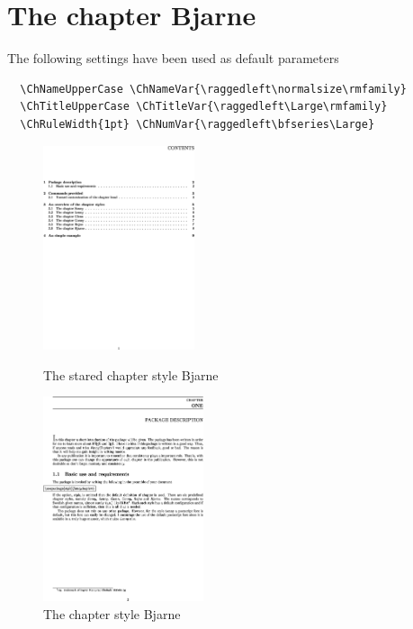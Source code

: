 \documentclass{report}
\begin{document}
    \section{The chapter Bjarne}
    The following settings have been used as default parameters
    {\small\begin{verbatim}
  \ChNameUpperCase \ChNameVar{\raggedleft\normalsize\rmfamily}
  \ChTitleUpperCase \ChTitleVar{\raggedleft\Large\rmfamily}
  \ChRuleWidth{1pt} \ChNumVar{\raggedleft\bfseries\Large}
     \end{verbatim}}
    \begin{figure}[h]
      \begin{minipage}{7 cm}
        \centerline{\includegraphics[height=6cm]{Bjarnes.eps}} 
        \caption{The stared chapter style Bjarne}
      \end{minipage}\hfill
      \begin{minipage}{7 cm}
        \centerline{\includegraphics[height=6cm]{Bjarne.eps}}
        \caption{The chapter style Bjarne}
      \end{minipage}\hfill
    \end{figure}
\end{document}
